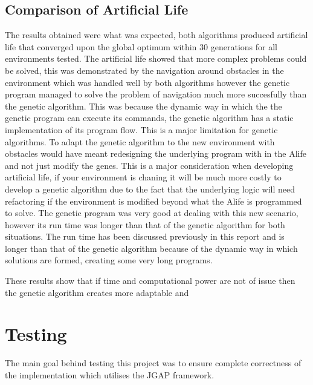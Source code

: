 \documentclass[12pt]{article}
\begin{document}
\subsection{Comparison of Artificial Life}
The results obtained were what was expected, both algorithms produced artificial life that converged upon the global optimum within 30 generations
for all environments tested. The artificial life showed that more complex problems could be solved, this was demonstrated by the navigation around
obstacles in the environment which was handled well by both algorithms however the genetic program managed to solve the problem of navigation much
more succesfully than the genetic algorithm. This was because the dynamic way in which the the genetic program can execute its commands, the genetic
algorithm has a static implementation of its program flow. This is a major limitation for genetic algorithms. To adapt the genetic algorithm to the
new environment with obstacles would have meant redesigning the underlying program with in the Alife and not just modify the genes. This is a major 
consideration when developing artificial life, if your environment is chaning it will be much more costly to develop a genetic algorithm due to the 
fact that the underlying logic will need refactoring if the environment is modified beyond what the Alife is programmed to solve. The genetic 
program was very good at dealing with this new scenario, however its run time was longer than that of the genetic algorithm for both situations. The 
run time has been discussed previously in this report and is longer than that of the genetic algorithm because of the dynamic way in which solutions
are formed, creating some very long programs. 

These results show that if time and computational power are not of issue then the genetic algorithm creates more adaptable and 


\section{Testing}
The main goal behind testing this project was to ensure complete correctness of the implementation which utilises the JGAP framework.
\end{document}
